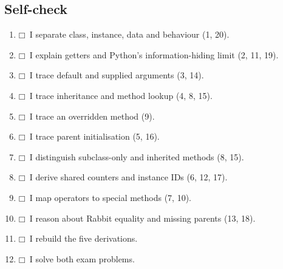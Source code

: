 \documentclass[11pt]{article}
\begin{document}
\begin{keepsection}
\section{Self-check}

\begin{enumerate}
\item $\mdlgwhtsquare$\  I separate class, instance, data and behaviour (1, 20).
\item $\mdlgwhtsquare$\  I explain getters and Python’s information-hiding limit (2, 11, 19).
\item $\mdlgwhtsquare$\  I trace default and supplied arguments (3, 14).
\item $\mdlgwhtsquare$\  I trace inheritance and method lookup (4, 8, 15).
\item $\mdlgwhtsquare$\  I trace an overridden method (9).
\item $\mdlgwhtsquare$\  I trace parent initialisation (5, 16).
\item $\mdlgwhtsquare$\  I distinguish subclass-only and inherited methods (8, 15).
\item $\mdlgwhtsquare$\  I derive shared counters and instance IDs (6, 12, 17).
\item $\mdlgwhtsquare$\  I map operators to special methods (7, 10).
\item $\mdlgwhtsquare$\  I reason about Rabbit equality and missing parents (13, 18).
\item $\mdlgwhtsquare$\  I rebuild the five derivations.
\item $\mdlgwhtsquare$\  I solve both exam problems.
\end{enumerate}
\end{keepsection}


\clearpage
\end{document}
